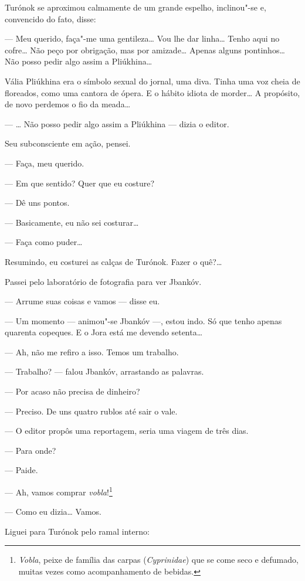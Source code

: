 Turónok se aproximou calmamente de um grande espelho, inclinou"-se e,
convencido do fato, disse:

--- Meu querido, faça"-me uma gentileza\ldots{} Vou lhe dar linha\ldots{}
Tenho aqui no cofre\ldots{} Não peço por obrigação, mas por amizade\ldots{} Apenas
alguns pontinhos\ldots{} Não posso pedir algo assim a Pliúkhina\ldots{}

Vália Pliúkhina era o símbolo sexual do jornal, uma diva. Tinha uma voz
cheia de floreados, como uma cantora de ópera. E o hábito idiota de
morder\ldots{} A propósito, de novo perdemos o fio da meada\ldots{}

--- \ldots{} Não posso pedir algo assim a Pliúkhina --- dizia o
editor.

Seu subconsciente em ação, pensei.

--- Faça, meu querido.

--- Em que sentido? Quer que eu costure?

--- Dê uns pontos.

--- Basicamente, eu não sei costurar\ldots{}

--- Faça como puder\ldots{}

Resumindo, eu costurei as calças de Turónok. Fazer o quê?\ldots{}

Passei pelo laboratório de fotografia para ver Jbankóv.

--- Arrume suas coisas e vamos --- disse eu.

--- Um momento --- animou"-se Jbankóv ---, estou
indo. Só que tenho apenas quarenta copeques. E o Jora está me devendo
setenta\ldots{}

--- Ah, não me refiro a isso. Temos um trabalho.

--- Trabalho? --- falou Jbankóv, arrastando as palavras.

--- Por acaso não precisa de dinheiro?

--- Preciso. De uns quatro rublos até sair o vale.

--- O editor propôs uma reportagem, seria uma viagem de três
dias.

--- Para onde?

--- Paide.

--- Ah, vamos comprar \emph{vobla}!\footnote{\emph{Vobla}, peixe
  de família das carpas (\emph{Cyprinidae}) que se come seco e defumado,
  muitas vezes como acompanhamento de bebidas.}

--- Como eu dizia\ldots{} Vamos.

Liguei para Turónok pelo ramal interno:

